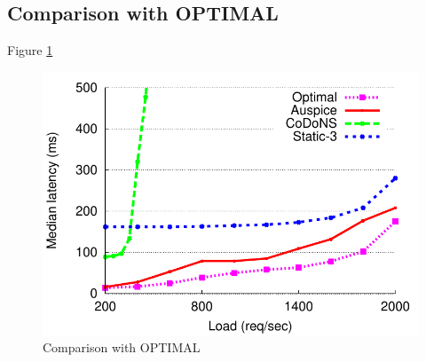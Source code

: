 \subsection{Comparison with OPTIMAL}

Figure \ref{fig:optimal}

\begin{figure}[t]
\centering
\includegraphics[scale=0.5]{graph/medianlatencyVSload_optimal.pdf}
\caption{Comparison with OPTIMAL}
\label{fig:optimal}
\end{figure}





